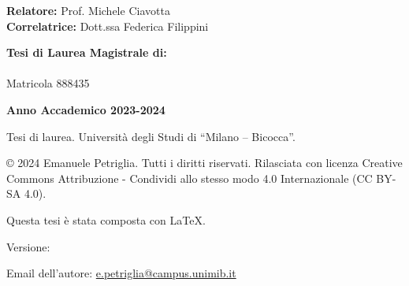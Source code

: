 \begin{titlepage}
    \begin{minipage}[t]{\textwidth}
    \end{minipage}
    
    \vspace{10mm}
    
    \begin{center}
        \Huge{
            \textbf{\thetitle}
            }
    \end{center}
    
    \vspace{30mm}
    \begin{flushleft}
        \noindent
        {\large \textbf{Relatore:} Prof. Michele Ciavotta } \\
    
        \noindent
        {\large \textbf{Correlatrice:} Dott.ssa Federica Filippini}
    \end{flushleft}
    
    \vspace{10mm}
    \begin{flushright}
        {\large \textbf{Tesi di Laurea Magistrale di:}} \\
        \large{\theauthor} \\
        \large{Matricola 888435} 
    \end{flushright}
    
    \vspace{5mm}
    \begin{center}
        {\large{\bf Anno Accademico 2023-2024}}
    \end{center}

    \restoregeometry %
\end{titlepage}

{
    \thispagestyle{empty}
    \setlength{\parindent}{0pt}
    
    \mbox{} 
    \vfill
    
    \hrulefill %
    
    \vspace{2mm} \textbf{\thetitle}
    
    \vspace{2mm} Tesi di laurea. Università degli Studi di ``Milano -- Bicocca''.
    
    \vspace{8mm} \small © 2024 Emanuele Petriglia. Tutti i diritti riservati. Rilasciata con licenza Creative Commons Attribuzione - Condividi allo stesso modo 4.0 Internazionale (CC BY-SA 4.0).
    
    \vspace{4mm} Questa tesi è stata composta con \LaTeX.
    
    \vspace{4mm} Versione: \theversion
    
    \vspace{2mm} Email dell'autore: \url{e.petriglia@campus.unimib.it}
    
    \cleardoublepage
}

